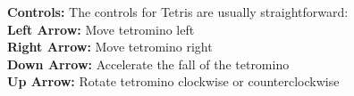 \textbf{Controls:} The controls for Tetris are usually straightforward:\vspace{1mm}\\
\textbf{Left Arrow: }Move tetromino left\\
\textbf{Right Arrow: }Move tetromino right\\
\textbf{Down Arrow: }Accelerate the fall of the tetromino\\
\textbf{Up Arrow: }Rotate tetromino clockwise or counterclockwise\\

